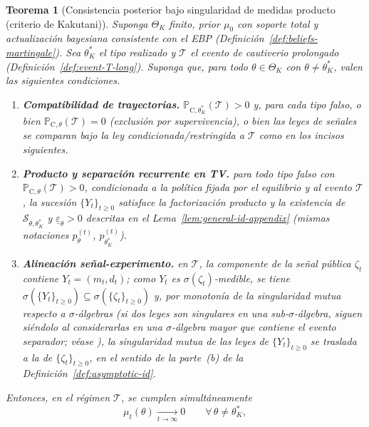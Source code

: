 \documentclass[12pt]{article}
\providecommand{\textcite}{\citet}
\newtheorem{theorem}{Teorema}[section]
\theoremstyle{definition}
\theoremstyle{remark}
\newcommand{\ProbC}[1]{\mathbb{P}_{\mathrm{C},#1}}
\newcommand{\1}{\mathbf{1}}
\begin{document}
\begin{theorem}[Consistencia posterior bajo singularidad de medidas producto \textup{(}criterio de Kakutani\textup{)}]
\label{thm:posterior-consistency-appendix}
Suponga $\Theta_K$ finito, prior $\mu_0$ con soporte total y actualización bayesiana consistente con el EBP \textup{(}Definición~\ref{def:beliefs-martingale}\textup{)}. Sea $\theta_K^\ast$ el tipo realizado y $\mathcal{T}$ el evento de cautiverio prolongado \textup{(}Definición~\ref{def:event-T-long}\textup{)}. Suponga que, para todo $\theta\in\Theta_K$ con $\theta\neq\theta_K^\ast$, valen las siguientes condiciones.
\begin{enumerate}
  \item[\textup{(i)}] \textbf{Compatibilidad de trayectorias.} $\ProbC{\theta_K^\ast}(\mathcal{T})>0$ y, para cada tipo falso, o bien $\ProbC{\theta}(\mathcal{T})=0$ \textup{(}exclusión por supervivencia\textup{)}, o bien las leyes de señales se comparan bajo la ley condicionada/restringida a $\mathcal{T}$ como en los incisos siguientes.
  \item[\textup{(ii)}] \textbf{Producto y separación recurrente en TV.} para todo tipo falso con $\ProbC{\theta}(\mathcal{T})>0$, condicionada a la política fijada por el equilibrio y al evento $\mathcal{T}$, la sucesión $\{Y_t\}_{t\ge 0}$ satisface la factorización producto y la existencia de $\mathcal{S}_{\theta,\theta_K^\ast}$ y $\underline{\varepsilon}_\theta>0$ descritas en el Lema~\ref{lem:general-id-appendix} \textup{(}mismas notaciones $p_\theta^{(t)}$, $p_{\theta_K^\ast}^{(t)}$\textup{)}.
  \item[\textup{(iii)}] \textbf{Alineación señal-experimento.} en $\mathcal{T}$, la componente de la señal pública $\zeta_t$ contiene $Y_t=(m_t,d_t)$; como $Y_t$ es $\sigma(\zeta_t)$-medible, se tiene $\sigma(\{Y_t\}_{t\ge 0})\subseteq\sigma(\{\zeta_t\}_{t\ge 0})$ y, por monotonía de la singularidad mutua respecto a $\sigma$-álgebras \textup{(}si dos leyes son singulares en una sub-$\sigma$-álgebra, siguen siéndolo al considerarlas en una $\sigma$-álgebra mayor que contiene el evento separador; véase \textcite{Shiryaev2019Probability,Schervish1995Theory}\textup{)}, la singularidad mutua de las leyes de $\{Y_t\}_{t\ge 0}$ se traslada a la de $\{\zeta_t\}_{t\ge 0}$, en el sentido de la parte~\textup{(b)} de la Definición~\ref{def:asymptotic-id}.
\end{enumerate}
Entonces, en el régimen $\mathcal{T}$, se cumplen simultáneamente
\[
\mu_t(\theta)\xrightarrow[t\to\infty]{}0
\qquad
\forall\,\theta\neq\theta_K^\ast,
\]
\end{theorem}
\end{document}
